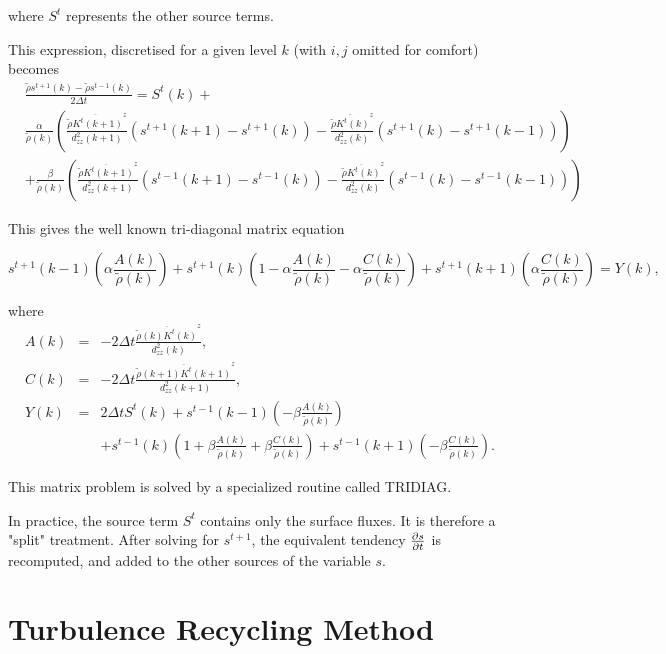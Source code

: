 where $S^t$ represents the other source terms.

This expression, discretised for a given level $k$ (with $i,j$
omitted for comfort) becomes
\begin{eqnarray}
&\frac{\tilde{\rho} s^{t+1}(k)-\tilde{\rho} s^{t-1}(k)}{2 \Delta t} =
S^t(k)+\nonumber \\
&\frac{\alpha}{\tilde{\rho}(k)}
(\frac {{\overline{\tilde{\rho}{K}^t(k+1)}}^z}{d_{zz}^2(k+1)}
(s^{t+1}(k+1)-s^{t+1}(k)) -
\frac {{\overline{\tilde{\rho}{K}^t(k)}}^z}{d_{zz}^2(k)}
(s^{t+1}(k)-s^{t+1}(k-1))) \nonumber \\
&+\frac{\beta}{\tilde{\rho}(k)}
(\frac {{\overline{\tilde{\rho}{K}^t(k+1)}}^z}{d_{zz}^2(k+1)}
(s^{t-1}(k+1)-s^{t-1}(k)) -
\frac {{\overline{\tilde{\rho}{K}^t(k)}}^z}{d_{zz}^2(k)}
(s^{t-1}(k)-s^{t-1}(k-1)))
\end{eqnarray}

This gives the well known tri-diagonal matrix equation

\begin{equation}
s^{t+1}(k-1)(\alpha \frac{A(k)}{\tilde{\rho}(k)}) +
s^{t+1}(k)
(1-\alpha \frac{A(k)}{\tilde{\rho}(k)}-\alpha\frac{C(k)}{\tilde{\rho}(k)})
+s^{t+1}(k+1)(\alpha \frac{C(k)}{\tilde{\rho}(k)}) = Y(k),
\end{equation}

where
\begin{eqnarray}
A(k)&=&-2 \Delta t
\frac {{\overline{\tilde{\rho}(k){K}^t(k)}^z}}{d_{zz}^2(k)} ,\\
C(k)&=&-2 \Delta t
\frac {{\overline{\tilde{\rho}(k+1){K}^t(k+1)}^z}}{d_{zz}^2(k+1)} ,\\
Y(k)&=&2 \Delta t S^t(k)+ s^{t-1}(k-1)(-\beta  \frac{A(k)}{\tilde{\rho}(k)})
\nonumber \\
&& + s^{t-1}(k)
(1+\beta  \frac{A(k)}{\tilde{\rho}(k)}+\beta \frac{C(k)}{\tilde{\rho}(k)})
+s^{t-1}(k+1)(-\beta \frac{C(k)}{\tilde{\rho}(k)}).
\end{eqnarray}

This matrix problem is solved by a specialized routine called TRIDIAG.

In practice, the source term $S^t$ contains only the surface fluxes. It is
therefore a "split" treatment. After solving for $s^{t+1}$, the equivalent
tendency ${\partial s \over \partial t}$ is recomputed, and added to the
other sources of the variable $s$.


\section{Turbulence Recycling Method}

